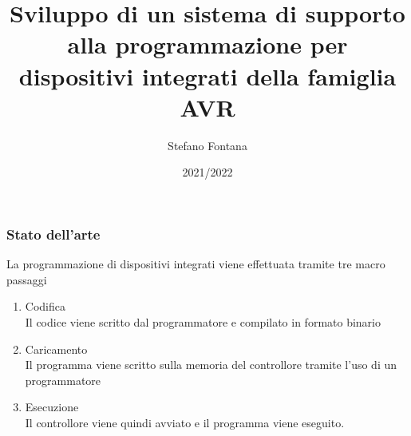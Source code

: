 \documentclass[aspectratio=169, handout]{beamer}
\title[Relazione Finale]{Sviluppo di un sistema di supporto alla programmazione per dispositivi integrati della famiglia AVR}
\author[S.Fontana Matr. 727199]{Stefano Fontana}
\date{2021/2022}
\begin{document}
    \maketitle

    \begin{frame}
        \frametitle{Stato dell'arte}

        La programmazione di dispositivi integrati viene effettuata tramite tre macro passaggi

        \begin{enumerate}
            \item<1-> Codifica \\
            {\footnotesize Il codice viene scritto dal programmatore e compilato in formato binario}
            \item<2-> Caricamento \\
            {\footnotesize Il programma viene scritto sulla memoria del controllore tramite l'uso di un programmatore}
            \item<3-> Esecuzione\\
            {\footnotesize Il controllore viene quindi avviato e il programma viene eseguito.}
        \end{enumerate}
    
    \end{frame}
\end{document}
